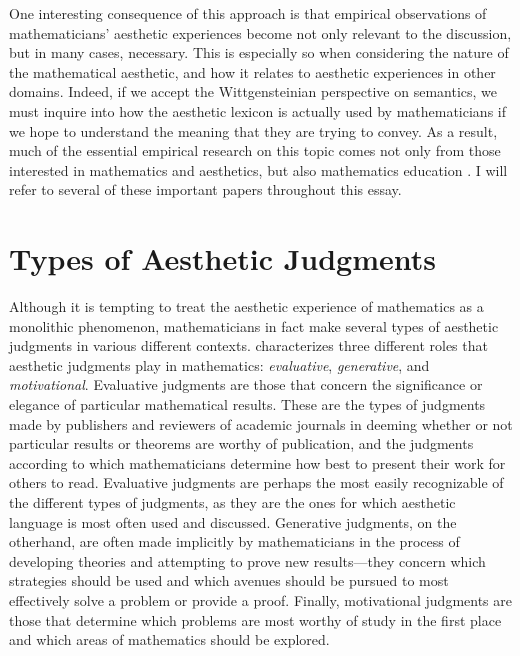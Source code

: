 \documentclass[a4paper,man,natbib]{apa6}
\begin{document}
One interesting consequence of this approach is that empirical observations of mathematicians' aesthetic experiences
become not only relevant to the discussion, but in many cases, necessary. This is especially so when considering the 
nature of the mathematical aesthetic, and how it relates to aesthetic experiences in other domains. Indeed, if we accept the
Wittgensteinian perspective on semantics, we must inquire into how the aesthetic lexicon is actually used by mathematicians if we hope to 
understand the meaning that they are trying to convey. As a result, much of the essential empirical research on this topic comes not only 
from those interested in mathematics and aesthetics, but also mathematics education \citep{dreyfus_aesthetics_1986,
inglis_beauty_2015,larvor_diversity_2016,inglis_are_2020,sa_mathematicians_2023}. I will refer to several of these 
important papers throughout this essay.

\section{Types of Aesthetic Judgments}
Although it is tempting to treat the aesthetic experience of mathematics as a monolithic phenomenon, mathematicians in
fact make several types of aesthetic judgments in various different contexts. 
\cite{sinclair_roles_2004,sinclair_aesthetic_2011} characterizes three different roles that aesthetic judgments play in mathematics:
\textit{evaluative}, \textit{generative}, and \textit{motivational}. Evaluative judgments are those that concern
the significance or elegance of particular mathematical results. These are the types of judgments made by publishers and
reviewers of academic journals in deeming whether or not particular results or theorems are worthy of 
publication, and the judgments according to which mathematicians determine how best to present their work for 
others to read. Evaluative judgments are perhaps the most easily recognizable
of the different types of judgments, as they are the ones for which aesthetic language is most often used and discussed.
Generative judgments, on the otherhand, are often made implicitly by mathematicians in the process of developing theories
and attempting to prove new results---they concern which strategies should be used and which avenues should be pursued
to most effectively solve a problem or provide a proof. Finally, motivational judgments are those that determine which
problems are most worthy of study in the first place and which areas of mathematics should be explored.
\end{document}
